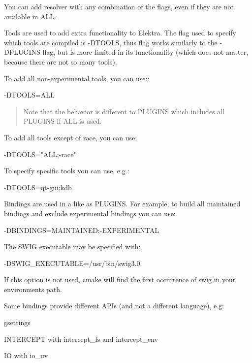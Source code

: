 You can add resolver with any combination of the flags, even if they are not available in {\ttfamily A\+LL}.

Tools are used to add extra functionality to Elektra. The flag used to specify which tools are compiled is {\ttfamily -\/\+D\+T\+O\+O\+LS}, thus flag works similarly to the {\ttfamily -\/\+D\+P\+L\+U\+G\+I\+NS} flag, but is more limited in its functionality (which does not matter, because there are not so many tools).

To add all non-\/experimental tools, you can use\+:\+:


\begin{DoxyCode}
-DTOOLS=ALL
\end{DoxyCode}


\begin{quote}
Note that the behavior is different to P\+L\+U\+G\+I\+NS which includes all P\+L\+U\+G\+I\+NS if A\+LL is used. \end{quote}


To add all tools except of race, you can use\+:


\begin{DoxyCode}
-DTOOLS="ALL;-race"
\end{DoxyCode}


To specify specific tools you can use, e.\+g.\+:


\begin{DoxyCode}
-DTOOLS=qt-gui;kdb
\end{DoxyCode}


Bindings are used in a like as {\ttfamily P\+L\+U\+G\+I\+NS}. For example, to build all maintained bindings and exclude experimental bindings you can use\+:


\begin{DoxyCode}
-DBINDINGS=MAINTAINED;-EXPERIMENTAL
\end{DoxyCode}


The S\+W\+IG executable may be specified with\+:


\begin{DoxyCode}
-DSWIG\_EXECUTABLE=/usr/bin/swig3.0
\end{DoxyCode}


If this option is not used, cmake will find the first occurrence of {\ttfamily swig} in your environment\textquotesingle{}s path.

Some bindings provide different A\+P\+Is (and not a different language), e.\+g\+:


\begin{DoxyItemize}
\item {\ttfamily gsettings}
\item {\ttfamily I\+N\+T\+E\+R\+C\+E\+PT} with {\ttfamily intercept\+\_\+fs} and {\ttfamily intercept\+\_\+env}
\item {\ttfamily IO} with {\ttfamily io\+\_\+uv}
\end{DoxyItemize}

